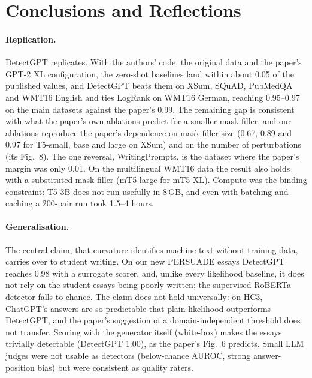\documentclass[11pt]{article}
\begin{document}
\section{Conclusions and Reflections}
\paragraph{Replication.} DetectGPT replicates. With the authors' code, the original data and the paper's GPT-2 XL configuration, the zero-shot baselines land within about 0.05 of the published values, and DetectGPT beats them on XSum, SQuAD, PubMedQA and WMT16 English and ties LogRank on WMT16 German, reaching 0.95--0.97 on the main datasets against the paper's 0.99. The remaining gap is consistent with what the paper's own ablations predict for a smaller mask filler, and our ablations reproduce the paper's dependence on mask-filler size (0.67, 0.89 and 0.97 for T5-small, base and large on XSum) and on the number of perturbations (its Fig.~8). The one reversal, WritingPrompts, is the dataset where the paper's margin was only 0.01. On the multilingual WMT16 data the result also holds with a substituted mask filler (mT5-large for mT5-XL). Compute was the binding constraint: T5-3B does not run usefully in 8\,GB, and even with batching and caching a 200-pair run took 1.5--4 hours.

\paragraph{Generalisation.} The central claim, that curvature identifies machine text without training data, carries over to student writing. On our new PERSUADE essays DetectGPT reaches 0.98 with a surrogate scorer, and, unlike every likelihood baseline, it does not rely on the student essays being poorly written; the supervised RoBERTa detector falls to chance. The claim does not hold universally: on HC3, ChatGPT's answers are so predictable that plain likelihood outperforms DetectGPT, and the paper's suggestion of a domain-independent threshold does not transfer. Scoring with the generator itself (white-box) makes the essays trivially detectable (DetectGPT 1.00), as the paper's Fig.~6 predicts. Small LLM judges were not usable as detectors (below-chance AUROC, strong answer-position bias) but were consistent as quality raters.
\end{document}
